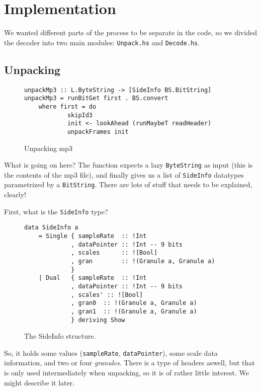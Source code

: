 \documentclass[a4paper,12pt]{article}
\begin{document}
\section{Implementation}
    We wanted different parts of the process to be separate in the code, so we
    divided the decoder into two main modules: \texttt{Unpack.hs} and
    \texttt{Decode.hs}.

    \subsection{Unpacking}
\begin{figure}[h]
  \begin{center}
    \begin{lstlisting}
unpackMp3 :: L.ByteString -> [SideInfo BS.BitString]
unpackMp3 = runBitGet first . BS.convert
    where first = do
            skipId3
            init <- lookAhead (runMaybeT readHeader)
            unpackFrames init
    \end{lstlisting}
    \caption{Unpacking mp3}\label{fig:unpacking_mp3}
  \end{center}
\end{figure}

    What is going on here? The function expects a lazy \texttt{ByteString} as
    input (this is the contents of the mp3 file), and finally gives us a list of
    \texttt{SideInfo} datatypes parametrized by a \texttt{BitString}. There are
    lots of stuff that needs to be explained, clearly!

    First, what is the \texttt{SideInfo} type?
\begin{figure}[h]
  \begin{center}
    \begin{lstlisting}
data SideInfo a
    = Single { sampleRate  :: !Int
             , dataPointer :: !Int -- 9 bits
             , scales      :: ![Bool]
             , gran        :: !(Granule a, Granule a)
             }
    | Dual   { sampleRate  :: !Int
             , dataPointer :: !Int -- 9 bits
             , scales' :: ![Bool]
             , gran0  :: !(Granule a, Granule a)
             , gran1  :: !(Granule a, Granule a)
             } deriving Show
    \end{lstlisting}
    \caption{The SideInfo structure.}\label{fig:sideinfo_struct}
  \end{center}
\end{figure}

    So, it holds some values (\texttt{sampleRate}, \texttt{dataPointer}), some
    scale data information, and two or four \textit{granules}. There is a type
    of headers aswell, but that is only used intermediately when unpacking, so
    it is of rather little interest. We might describe it later.
\end{document}
